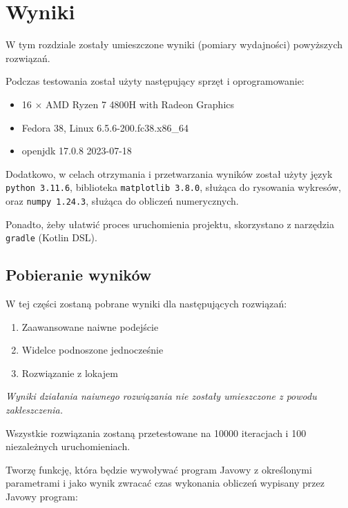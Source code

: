 \documentclass[11pt]{article}
\providecommand{\tightlist}{%
      \setlength{\itemsep}{0pt}\setlength{\parskip}{0pt}}
\begin{document}
    \hypertarget{wyniki}{%
\section{Wyniki}\label{wyniki}}

W tym rozdziale zostały umieszczone wyniki (pomiary wydajności)
powyższych rozwiązań.

Podczas testowania został użyty następujący sprzęt i oprogramowanie:

\begin{itemize}
\tightlist
\item
  16 × AMD Ryzen 7 4800H with Radeon Graphics
\item
  Fedora 38, Linux 6.5.6-200.fc38.x86\_64
\item
  openjdk 17.0.8 2023-07-18
\end{itemize}

Dodatkowo, w celach otrzymania i przetwarzania wyników został użyty
język \texttt{python\ 3.11.6}, biblioteka \texttt{matplotlib\ 3.8.0},
służąca do rysowania wykresów, oraz \texttt{numpy\ 1.24.3}, służąca do
obliczeń numerycznych.

Ponadto, żeby ułatwić proces uruchomienia projektu, skorzystano z
narzędzia \texttt{gradle} (Kotlin DSL).

    \hypertarget{pobieranie-wynikuxf3w}{%
\subsection{Pobieranie wyników}\label{pobieranie-wynikuxf3w}}

W tej części zostaną pobrane wyniki dla następujących rozwiązań:

\begin{enumerate}
\def\labelenumi{\arabic{enumi}.}
\tightlist
\item
  Zaawansowane naiwne podejście
\item
  Widelce podnoszone jednocześnie
\item
  Rozwiązanie z lokajem
\end{enumerate}

\emph{Wyniki działania naiwnego rozwiązania nie zostały umieszczone z
powodu zakleszczenia.}

Wszystkie rozwiązania zostaną przetestowane na 10000 iteracjach i 100
niezależnych uruchomieniach.

    Tworzę funkcję, która będzie wywoływać program Javowy z określonymi
parametrami i jako wynik zwracać czas wykonania obliczeń wypisany przez
Javowy program:
\end{document}
